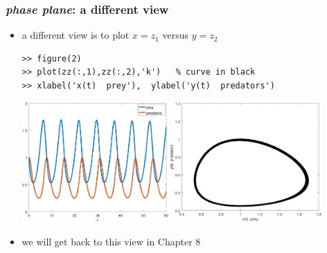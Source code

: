 \documentclass[urlcolor=blue,dvipsnames]{beamer}
\begin{document}
\begin{frame}[fragile]
\frametitle{\emph{phase plane}: a different view}

\begin{itemize}
\item a different view is to plot $x=z_1$ versus $y=z_2$

\begin{Verbatim}[fontsize=\small]
>> figure(2)
>> plot(zz(:,1),zz(:,2),'k')   % curve in black
>> xlabel('x(t)  prey'),  ylabel('y(t)  predators')
\end{Verbatim}

\bigskip
\mbox{\includegraphics[width=0.44\textwidth]{figs/lotka-time}\quad \includegraphics[width=0.46\textwidth]{figs/lotka-phase}}
\item we will get back to this view in Chapter 8
\end{itemize}
\end{frame}
\end{document}
